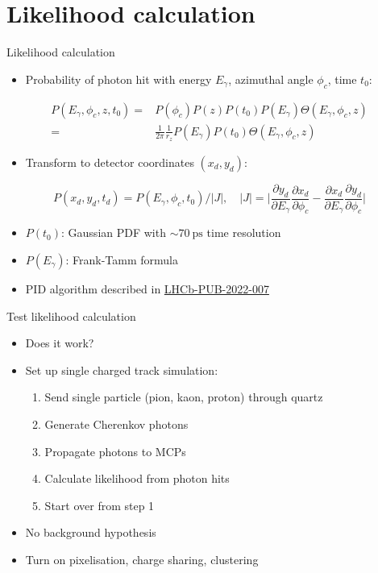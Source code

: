 \documentclass{beamer}
\begin{document}
\section{Likelihood calculation}
\begin{frame}{Likelihood calculation}
  \begin{itemize}
    \item{Probability of photon hit with energy $E_\gamma$, azimuthal angle $\phi_c$, time $t_0$:}
  \end{itemize}
  \begin{align*}
    P(E_\gamma, \phi_c, z, t_0) =& P(\phi_c)P(z)P(t_0)P(E_\gamma)\Theta(E_\gamma, \phi_c, z) \\
    =& \frac{1}{2\pi}\frac{1}{r_z}P(E_\gamma)P(t_0)\Theta(E_\gamma, \phi_c, z)
  \end{align*}
  \begin{itemize}
    \item{Transform to detector coordinates $(x_d, y_d)$:}
  \end{itemize}
  \begin{equation*}
    P(x_d, y_d, t_d) = P(E_\gamma, \phi_c, t_0)/\lvert J\rvert, \quad \lvert J\rvert = \Big\lvert\frac{\partial y_d}{\partial E_\gamma}\frac{\partial x_d}{\partial\phi_c} - \frac{\partial x_d}{\partial E_\gamma}\frac{\partial y_d}{\partial\phi_c}\Big\rvert
  \end{equation*}
  \begin{itemize}
    \item{$P(t_0)$: Gaussian PDF with $\sim\SI{70}{\pico\second}$ time resolution}
    \item{$P(E_\gamma)$: Frank-Tamm formula}
  \end{itemize}
  \begin{itemize}
    \item{PID algorithm described in \href{https://www.overleaf.com/project/5d0b9c5a5005405666aacd05}{LHCb-PUB-2022-007}}
  \end{itemize}
\end{frame}

\begin{frame}{Test likelihood calculation}
  \begin{itemize}
    \setlength\itemsep{1.5em}
    \item{Does it work?}
    \item{Set up single charged track simulation:}
    \begin{enumerate}
      \setlength\itemsep{0.8em}
      \item{Send single particle (pion, kaon, proton) through quartz}
      \item{Generate Cherenkov photons}
      \item{Propagate photons to MCPs}
      \item{Calculate likelihood from photon hits}
      \item{Start over from step 1}
    \end{enumerate}
    \item{No background hypothesis}
    \item{Turn on pixelisation, charge sharing, clustering}
  \end{itemize}
\end{frame}
\end{document}
